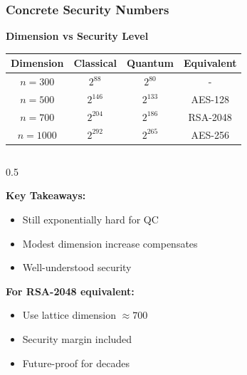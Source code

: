 \documentclass[aspectratio=169,10pt]{beamer}
\newcommand{\slideheader}[1]{\frametitle{#1}}
\theoremstyle{plain}
\begin{document}
\begin{frame}
  \slideheader{Concrete Security Numbers}
  
  \begin{center}
    \textbf{\large Dimension vs Security Level}
  \end{center}
  
  \vspace{0.3cm}
  
  \begin{table}
    \centering
    \begin{tabular}{|c|c|c|c|}
      \hline
      \textbf{Dimension} & \textbf{Classical} & \textbf{Quantum} & \textbf{Equivalent} \\
      \hline
      $n = 300$ & $2^{88}$ & $2^{80}$ & - \\
      $n = 500$ & $2^{146}$ & $2^{133}$ & AES-128 \\
      $n = 700$ & $2^{204}$ & $2^{186}$ & RSA-2048 \\
      $n = 1000$ & $2^{292}$ & $2^{265}$ & AES-256 \\
      \hline
    \end{tabular}
  \end{table}
  
  \vspace{0.5cm}
  
  \begin{columns}[T]
    \begin{column}{0.5\textwidth}

    \begin{greenBox}
      \textbf{Key Takeaways:}
      \begin{itemize}
        \item Still exponentially hard for QC
        \item Modest dimension increase compensates
        \item Well-understood security
      \end{itemize}
    \end{greenBox}
    
    \vspace{0.3cm}
    
    \textbf{For RSA-2048 equivalent:}
    \begin{itemize}
      \item Use lattice dimension $\approx 700$
      \item Security margin included
      \item Future-proof for decades
    \end{itemize}
  

\end{column}
\end{columns}
\end{frame}
\end{document}
